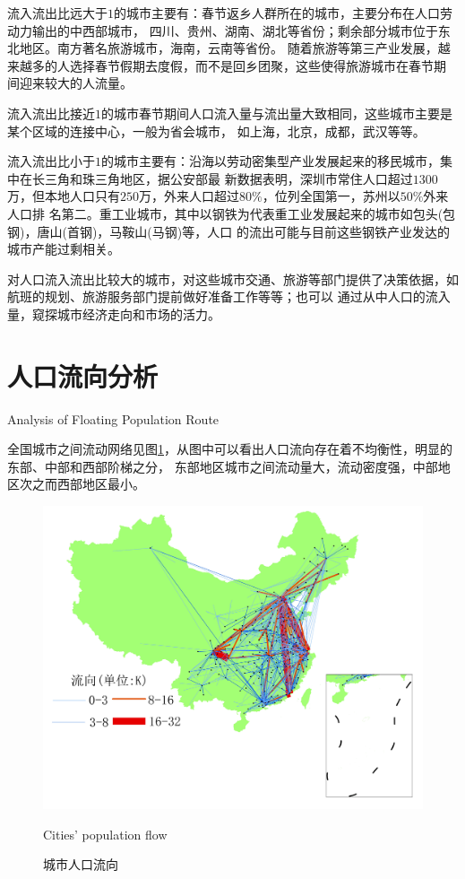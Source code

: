 流入流出比远大于$1$的城市主要有：春节返乡人群所在的城市，主要分布在人口劳动力输出的中西部城市，
四川、贵州、湖南、湖北等省份；剩余部分城市位于东北地区。南方著名旅游城市，海南，云南等省份。
随着旅游等第三产业发展，越来越多的人选择春节假期去度假，而不是回乡团聚，这些使得旅游城市在春节期
间迎来较大的人流量。

流入流出比接近$1$的城市春节期间人口流入量与流出量大致相同，这些城市主要是某个区域的连接中心，一般为省会城市，
如上海，北京，成都，武汉等等。

流入流出比小于$1$的城市主要有：沿海以劳动密集型产业发展起来的移民城市，集中在长三角和珠三角地区，据公安部最
新数据表明，深圳市常住人口超过$1300$万，但本地人口只有$250$万，外来人口超过$80\%$，位列全国第一，苏州以$50\%$外来人口排
名第二。重工业城市，其中以钢铁为代表重工业发展起来的城市如包头(包钢)，唐山(首钢)，马鞍山(马钢)等，人口
的流出可能与目前这些钢铁产业发达的城市产能过剩相关\cite{冯梅陈鹏钢铁}。

对人口流入流出比较大的城市，对这些城市交通、旅游等部门提供了决策依据，如航班的规划、旅游服务部门提前做好准备工作等等；也可以
通过从中人口的流入量，窥探城市经济走向和市场的活力。

\section{人口流向分析}{Analysis of Floating Population Route}

全国城市之间流动网络见图\ref{fig:citiesflow}，从图中可以看出人口流向存在着不均衡性，明显的东部、中部和西部阶梯之分，
东部地区城市之间流动量大，流动密度强，中部地区次之而西部地区最小。
\begin{figure}
  \centering
  \includegraphics[scale=0.6]{figures/flow.jpg} \\
  \caption{城市人口流向}{Cities' population flow}
  \label{fig:citiesflow}
\end{figure}

